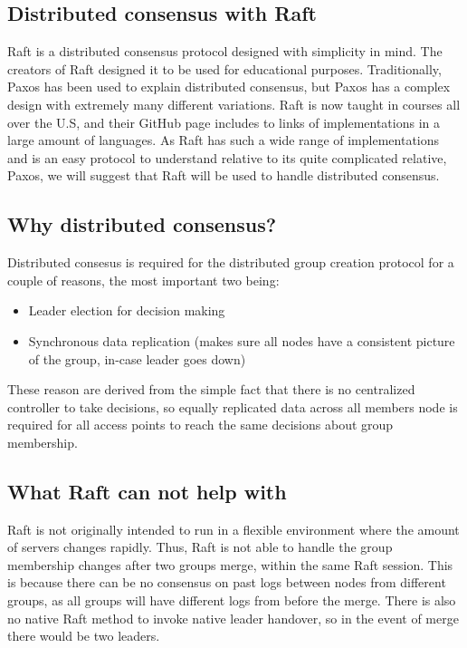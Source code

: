 \subsection{Distributed consensus with Raft}
Raft \cite{raftio} is a distributed consensus protocol designed with simplicity in mind. The creators of Raft designed it to be used for educational purposes. Traditionally, Paxos has been used to explain
distributed consensus, but Paxos has a complex design with extremely many different variations. Raft is now taught in courses all over the U.S, and their GitHub page includes to links
of implementations in a large amount of languages. As Raft has such a wide range of implementations and is an easy protocol to understand relative to its quite complicated relative, Paxos, 
we will suggest that Raft will be used to handle distributed consensus. 

\subsection{Why distributed consensus?}
Distributed consesus is required for the distributed group creation protocol for a couple of reasons, the most important two being:
\begin{itemize}
	\item Leader election for decision making
	\item	Synchronous data replication (makes sure all nodes have a consistent picture of the group, in-case leader goes down)
\end{itemize}

These reason are derived from the simple fact that there is no centralized controller to take decisions, so equally replicated data across all members node is required for all access
points to reach the same decisions about group membership. 

\subsection{What Raft can not help with}
Raft is not originally intended to run in a flexible environment where the amount of servers changes rapidly. Thus, Raft is not able to handle the group membership changes
after two groups merge, within the same Raft session. This is because there can be no consensus on past logs between nodes from different groups, as all groups will have different logs from before the merge. There is also no native Raft method to invoke native leader handover, so in the event of merge there would be two leaders. 


